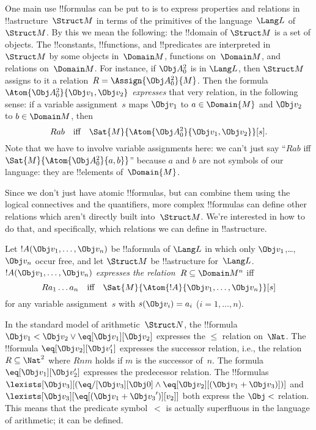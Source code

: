 \documentclass[../../../include/open-logic-section]{subfiles}
\begin{document}

\begin{explain}
One main use !!{formula}s can be put to is to express properties and
relations in !!a{structure}~$\Struct M$ in terms of the primitives of
the language~$\Lang L$ of~$\Struct M$.  By this we mean the following:
the !!{domain} of $\Struct M$ is a set of objects.  The !!{constant}s,
!!{function}s, and !!{predicate}s are interpreted in~$\Struct M$ by
some objects in~$\Domain M$, functions on~$\Domain M$, and relations
on~$\Domain M$.  For instance, if $\Obj A^2_0$ is in $\Lang L$, then
$\Struct M$ assigns to it a relation~$R = \Assign{{\Obj
  A^2_0}}{M}$. Then the formula $\Atom{\Obj A^2_0}{\Obj v_1, \Obj v_2}$
\emph{expresses} that very relation, in the following sense: if a
variable assignment~$s$ maps $\Obj v_1$ to $a \in \Domain{M}$ and
$\Obj v_2$ to $b \in \Domain M$, then
\[
Rab \text{\quad iff\quad} \Sat{M}{\Atom{\Obj A^2_0}{\Obj v_1, \Obj v_2}}[s].
\]
Note that we have to involve variable assignments here: we can't just
say ``$Rab$ iff $\Sat{M}{\Atom{\Obj A^2_0}{a, b}}$'' because $a$ and
  $b$ are not symbols of our language: they are !!{element}s
  of~$\Domain{M}$.

Since we don't just have atomic !!{formula}s, but can combine them
using the logical connectives and the quantifiers, more complex
!!{formula}s can define other relations which aren't directly built
into~$\Struct M$.  We're interested in how to do that, and
specifically, which relations we can define in !!a{structure}.
\end{explain}

\begin{defn}
Let $!A(\Obj v_1,\dots, \Obj v_n)$ be !!a{formula} of $\Lang L$ in
which only $\Obj v_1$,\dots, $\Obj v_n$ occur free, and let $\Struct
M$ be !!a{structure} for~$\Lang L$. $!A(\Obj v_1,\dots, \Obj v_n)$
\emph{expresses the relation}~$R \subseteq \Domain M^n$ iff
\[
Ra_1\dots a_n \text{\quad iff\quad} \Sat{M}{\Atom{!A}{\Obj
    v_1,\dots, \Obj v_n}}[s]
\]
for any variable assignment~$s$ with $s(\Obj v_i) = a_i$ ($i = 1,
\dots, n$).
\end{defn}

\begin{ex}
In the standard model of arithmetic~$\Struct N$, the !!{formula} $\Obj
v_1 < \Obj v_2 \lor \eq[\Obj v_1][\Obj v_2]$ expresses the $\le$
relation on~$\Nat$. The !!{formula} $\eq[\Obj v_2][\Obj v_1']$
expresses the successor relation, i.e., the relation $R \subseteq
\Nat^2$ where $Rnm$ holds if $m$ is the successor of~$n$. The formula
$\eq[\Obj v_1][\Obj v_2']$ expresses the predecessor relation.  The
!!{formula}s $\lexists[\Obj v_3][(\eq/[\Obj v_3][\Obj 0] \land
  \eq[\Obj v_2][(\Obj v_1 + \Obj v_3)])]$ and $\lexists[\Obj
  v_3][\eq[(\Obj v_1 + {\Obj v_3}')][v_2]]$ both express the $\Obj <$
relation.  This means that the predicate symbol~$<$ is actually
superfluous in the language of arithmetic; it can be defined.
\end{ex}
\end{document}
